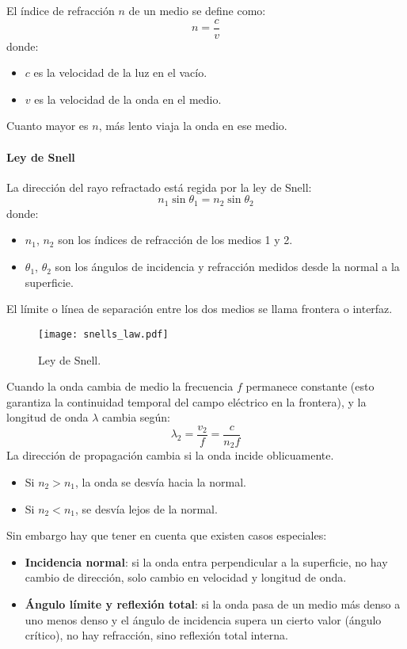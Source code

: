 El índice de refracción \(n\) de un medio se define como:
\[
n = \frac{c}{v}
\]
donde:
\begin{itemize}
  \item \(c\) es la velocidad de la luz en el vacío.
  \item \(v\) es la velocidad de la onda en el medio.
\end{itemize}
Cuanto mayor es \(n\), más lento viaja la onda en ese medio.

\paragraph{Ley de Snell}

La dirección del rayo refractado está regida por la ley de Snell:
\[
n_1 \sin \theta_1 = n_2 \sin \theta_2
\]
donde:
\begin{itemize}
  \item \(n_1\), \(n_2\) son los índices de refracción de los medios 1 y 2.
  \item \(\theta_1\), \(\theta_2\) son los ángulos de incidencia y refracción medidos desde la normal a la superficie.
\end{itemize}

El límite o línea de separación entre los dos medios se llama frontera o interfaz.

\begin{figure}[ht]
  \centering
  \texttt{[image: snells\_law.pdf]}
  \caption{Ley de Snell.}
  \label{fig:snells_law}
\end{figure}

Cuando la onda cambia de medio la frecuencia \(f\) permanece constante (esto garantiza la continuidad temporal del campo eléctrico en la frontera), y la longitud de onda \(\lambda\) cambia según:
\[
\lambda_2 = \frac{v_2}{f} = \frac{c}{n_2 f}
\]
La dirección de propagación cambia si la onda incide oblicuamente.
\begin{itemize}
  \item Si \(n_2 > n_1\), la onda se desvía hacia la normal.
  \item Si \(n_2 < n_1\), se desvía lejos de la normal.
\end{itemize}
Sin embargo hay que tener en cuenta que existen casos especiales:
\begin{itemize}
  \item \textbf{Incidencia normal}: si la onda entra perpendicular a la superficie, no hay cambio de dirección, solo cambio en velocidad y longitud de onda.
  \item \textbf{Ángulo límite y reflexión total}: si la onda pasa de un medio más denso a uno menos denso y el ángulo de incidencia supera un cierto valor (ángulo crítico), no hay refracción, sino reflexión total interna.
\end{itemize}


